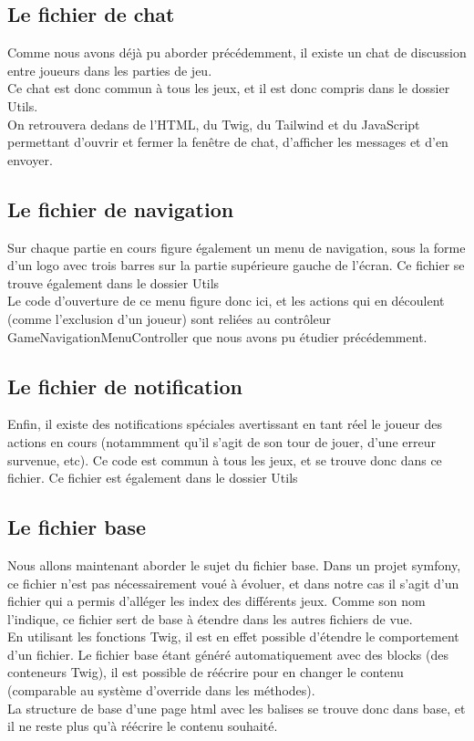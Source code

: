 \documentclass{article}
\begin{document}
        \subsection{Le fichier de chat}
            Comme nous avons déjà pu aborder précédemment, il existe un chat de discussion entre joueurs dans les parties de jeu.\\
            \indent Ce chat est donc commun à tous les jeux, et il est donc compris dans le dossier Utils.\\
            \indent On retrouvera dedans de l'HTML, du Twig, du Tailwind et du JavaScript permettant d'ouvrir et fermer la fenêtre de chat, d'afficher les messages et d'en envoyer.

        \subsection{Le fichier de navigation}
            Sur chaque partie en cours figure également un menu de navigation, sous la forme d'un logo avec trois barres sur la partie supérieure gauche de l'écran. Ce fichier se trouve également dans le dossier Utils\\
            \indent Le code d'ouverture de ce menu figure donc ici, et les actions qui en découlent (comme l'exclusion d'un joueur) sont reliées au contrôleur GameNavigationMenuController que nous avons pu étudier précédemment.

        \subsection{Le fichier de notification}
            Enfin, il existe des notifications spéciales avertissant en tant réel le joueur des actions en cours (notammment qu'il s'agit de son tour de jouer, d'une erreur survenue, etc). Ce code est commun à tous les jeux, et se trouve donc dans ce fichier. Ce fichier est également dans le dossier Utils

        \subsection{Le fichier base}
            Nous allons maintenant aborder le sujet du fichier base. Dans un projet symfony, ce fichier n'est pas nécessairement voué à évoluer, et dans notre cas il s'agit d'un fichier qui a permis d'alléger les index des différents jeux. Comme son nom l'indique, ce fichier sert de base à étendre dans les autres fichiers de vue.\\
            \indent En utilisant les fonctions Twig, il est en effet possible d'étendre le comportement d'un fichier. Le fichier base étant généré automatiquement avec des blocks (des conteneurs Twig), il est possible de réécrire pour en changer le contenu (comparable au système d'override dans les méthodes).\\
            \indent La structure de base d'une page html avec les balises se trouve donc dans base, et il ne reste plus qu'à réécrire le contenu souhaité.
\end{document}
